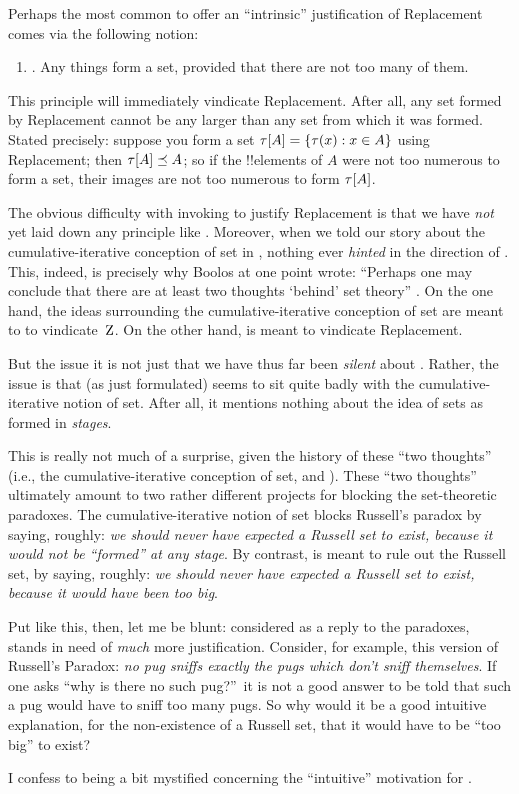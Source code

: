 \documentclass[../../../include/open-logic-section]{subfiles}
\begin{document}

Perhaps the most common to offer an ``intrinsic'' justification of
Replacement comes via the following notion:
\begin{enumerate}
	\item[] \limofsize. Any things form a set, provided that there are
	not too many of them.
\end{enumerate}
This principle will immediately vindicate Replacement. After all, any
set formed by Replacement cannot be any larger than any set from which
it was formed. Stated precisely: suppose you form a set
$\tau[A] = \{ \tau(x) : x \in A \}$ using Replacement;
then $\tau[A] \preceq A$; so if the !!{element}s of $A$
were not too numerous to form a set, their images are not too numerous
to form $\tau[A]$. 

The obvious difficulty with invoking \limofsize{} to justify
Replacement is that we have \emph{not} yet laid down any principle
like \limofsize. Moreover, when we told our story about the
cumulative-iterative conception of set in
, nothing ever \emph{hinted}
in the direction of \limofsize. This, indeed, is precisely why Boolos
at one point wrote: ``Perhaps one may conclude that there are at least
two thoughts `behind' set theory'' \citeyearpar[19]{Boolos1989}. On
the one hand, the ideas surrounding the cumulative-iterative
conception of set are meant to to vindicate~$\mathrm{Z}$. On the other hand,
\limofsize{} is meant to vindicate Replacement. 

But the issue it is not just that we have thus far been \emph{silent}
about \limofsize. Rather, the issue is that \limofsize{} (as just
formulated) seems to sit quite badly with the cumulative-iterative
notion of set. After all, it mentions nothing about the idea of sets
as formed in \emph{stages}.

This is really not much of a surprise, given the history of these
``two thoughts'' (i.e., the cumulative-iterative conception of set,
and \limofsize). These ``two thoughts'' ultimately amount to two
rather  different projects for blocking the set-theoretic paradoxes.
The cumulative-iterative notion of set blocks Russell's paradox by
saying, roughly: \emph{we should never have expected a Russell set to
exist, because it would not be ``formed'' at any stage}. By contrast,
\limofsize{} is meant to rule out the Russell set, by saying, roughly:
\emph{we should never have expected a Russell set to exist, because it
would have been too big}. 

Put like this, then, let me be blunt: considered as a reply to the
paradoxes, \limofsize{} stands in need of \emph{much} more
justification. Consider, for example, this version of Russell's
Paradox: \emph{no pug sniffs exactly the pugs which don't sniff
themselves}. If one asks ``why is there no such pug?''\ it is not a
good answer to be told that such a pug would have to sniff too many
pugs. So why would it be a good intuitive explanation, for the
non-existence of a Russell set, that it would have to be ``too big''
to exist? 

I confess to being a bit mystified concerning the ``intuitive''
motivation for \limofsize. 
\end{document}

